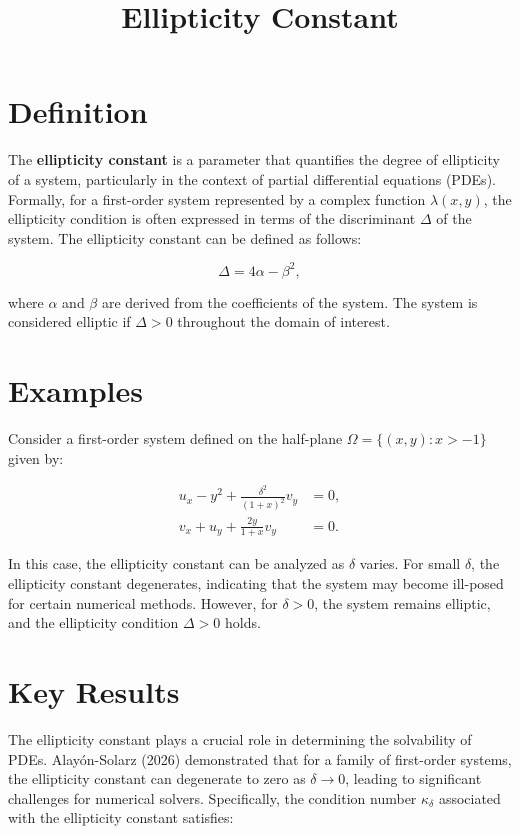 \documentclass[11pt,a4paper]{article}
\title{Ellipticity Constant}
\date{}
\begin{document}
\maketitle
\section{Definition}
The \textbf{ellipticity constant} is a parameter that quantifies the degree of ellipticity of a system, particularly in the context of partial differential equations (PDEs). Formally, for a first-order system represented by a complex function $\lambda(x, y)$, the ellipticity condition is often expressed in terms of the discriminant $\Delta$ of the system. The ellipticity constant can be defined as follows:

\begin{equation}
\Delta = 4\alpha - \beta^2,
\end{equation}

where $\alpha$ and $\beta$ are derived from the coefficients of the system. The system is considered elliptic if $\Delta > 0$ throughout the domain of interest.

\section{Examples}
Consider a first-order system defined on the half-plane $\Omega = \{(x, y) : x > -1\}$ given by:

\begin{equation}
\begin{aligned}
u_x - y^2 + \frac{\delta^2}{(1 + x)^2} v_y &= 0, \\
v_x + u_y + \frac{2y}{1 + x} v_y &= 0.
\end{aligned}
\end{equation}

In this case, the ellipticity constant can be analyzed as $\delta$ varies. For small $\delta$, the ellipticity constant degenerates, indicating that the system may become ill-posed for certain numerical methods. However, for $\delta > 0$, the system remains elliptic, and the ellipticity condition $\Delta > 0$ holds.

\section{Key Results}
The ellipticity constant plays a crucial role in determining the solvability of PDEs. Alayón-Solarz (2026) demonstrated that for a family of first-order systems, the ellipticity constant can degenerate to zero as $\delta \to 0$, leading to significant challenges for numerical solvers. Specifically, the condition number $\kappa_\delta$ associated with the ellipticity constant satisfies:
\end{document}
